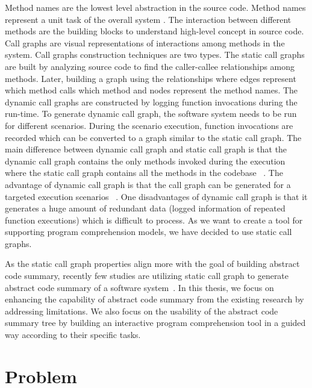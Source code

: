 Method names are the lowest level abstraction in the source code. Method names represent a unit task of the overall system \cite{de2012IRMethodsArtifacts, starke2009searching}. The interaction between different methods are the building blocks to understand high-level concept in source code. Call graphs are visual representations of interactions among methods in the system. Call graphs construction techniques are two types. The static call graphs are built by analyzing source code to find the caller-callee relationships among methods. Later, building a graph using the relationships where edges represent which method calls which method and nodes represent the method names. The dynamic call graphs are constructed by logging function invocations during the run-time. To generate dynamic call graph, the software system needs to be run for different scenarios. During the scenario execution, function invocations are recorded which can be converted to a graph similar to the static call graph. The main difference between dynamic call graph and static call graph is that the dynamic call graph contains the only methods invoked during the execution where the static call graph contains all the methods in the codebase ~\cite{gharibi2018automaticStaticCluster}. The advantage of dynamic call graph is that the call graph can be generated for a targeted execution scenarios ~\cite{feng2018hierarchicalExecutionComprehension}. One disadvantages of dynamic call graph is that it generates a huge amount of redundant data (logged information of repeated function executions) which is difficult to process. As we want to create a tool for supporting program comprehension models, we have decided to use static call graphs. 

As the static call graph properties align more with the goal of building abstract code summary, recently few studies are utilizing static call graph to generate abstract code summary of a software system~\cite{gharibi2018automaticStaticCluster, walunj2019graphevoEvolutionCall}. In this thesis, we focus on enhancing the capability of abstract code summary from the existing research by addressing limitations. We also focus on the usability of the abstract code summary tree by building an interactive program comprehension tool
in a guided way according to their specific tasks. 

 
\newpage


\section{Problem }
\label{intro:problem}
